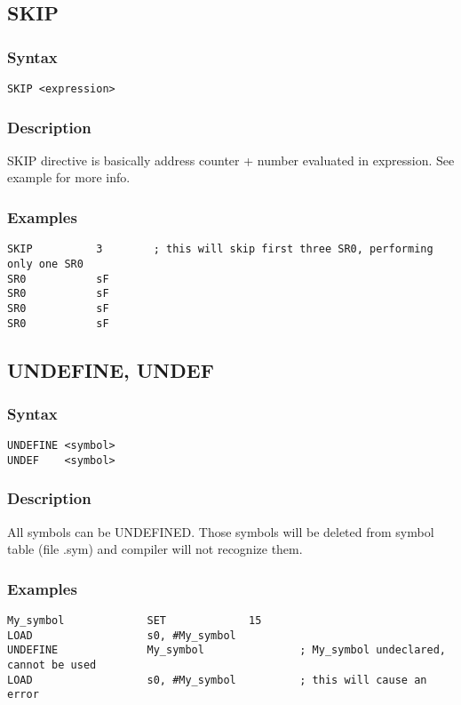     \subsection{SKIP}
        \subsubsection{Syntax}
            \verb'SKIP <expression>'

        \subsubsection{Description}
            SKIP directive is basically address counter + number evaluated in expression. See example for more info.

        \subsubsection{Examples}
            \verb'SKIP          3        ; this will skip first three SR0, performing only one SR0'\\
            \verb'SR0           sF'\\
            \verb'SR0           sF'\\
            \verb'SR0           sF'\\
            \verb'SR0           sF'

    \subsection{UNDEFINE, UNDEF}
        \subsubsection{Syntax}
            \verb'UNDEFINE <symbol>'\\
            \verb'UNDEF    <symbol>'

        \subsubsection{Description}
            All symbols can be UNDEFINED. Those symbols will be deleted from symbol table (file .sym) and compiler will not recognize them.

        \subsubsection{Examples}
            \verb'My_symbol             SET             15'\\
            \verb'LOAD                  s0, #My_symbol'\\
            \verb'UNDEFINE              My_symbol               ; My_symbol undeclared, cannot be used'\\
            \verb'LOAD                  s0, #My_symbol          ; this will cause an error'

